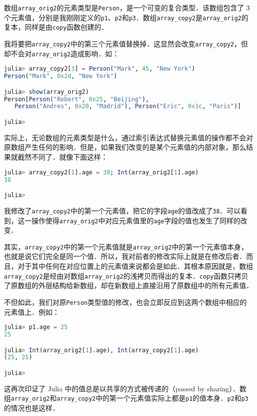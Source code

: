 数组\verb|array_orig2|的元素类型是\verb|Person|，是一个可变的复合类型．该数组包含了 3 个元素值，分别是我刚刚定义的\verb|p1|、\verb|p2|和\verb|p3|．数组\verb|array_copy2|是\verb|array_orig2|的复本，同样是由\verb|copy|函数创建的．

我将要把\verb|array_copy2|中的第三个元素值替换掉．这显然会改变\verb|array_copy2|，但却不会对\verb|array_orig2|造成影响．如：

\begin{lstlisting}[language=julia]
julia> array_copy2[3] = Person("Mark", 45, "New York")
Person("Mark", 0x2d, "New York")

julia> show(array_orig2)
Person[Person("Robert", 0x25, "Beijing"),
   Person("Andres", 0x20, "Madrid"), Person("Eric", 0x1c, "Paris")]

julia> 
\end{lstlisting}

实际上，无论数组的元素类型是什么，通过索引表达式替换元素值的操作都不会对原数组产生任何的影响．但是，如果我们改变的是某个元素值的内部对象，那么结果就截然不同了．就像下面这样：

\begin{lstlisting}[language=julia]
julia> array_copy2[1].age = 38; Int(array_orig2[1].age)
38

julia> 
\end{lstlisting}

我修改了\verb|array_copy2|中的第一个元素值，把它的字段\verb|age|的值改成了\verb|38|．可以看到，这一操作使得\verb|array_orig2|中对应元素值里的\verb|age|字段的值也发生了同样的改变．

其实，\verb|array_copy2|中的第一个元素值就是\verb|array_orig2|中的第一个元素值本身，也就是说它们完全是同一个值．所以，我对前者的修改实际上就是在修改后者．而且，对于其中任何在对应位置上的元素值来说都会是如此．其根本原因就是，数组\verb|array_copy2|是经由对数组\verb|array_orig2|的浅拷贝而得出的复本．\verb|copy|函数只拷贝了原数组的外层结构给新数组，却在新数组上直接沿用了原数组中的所有元素值．

不但如此，我们对原\verb|Person|类型值的修改，也会立即反应到这两个数组中相应的元素值上．例如：

\begin{lstlisting}[language=julia]
julia> p1.age = 25
25

julia> Int(array_orig2[1].age), Int(array_copy2[1].age)
(25, 25)

julia> 
\end{lstlisting}

这再次印证了 Julia 中的值总是以共享的方式被传递的（passed by sharing）．数组\verb|array_orig2|和\verb|array_copy2|中的第一个元素值实际上都是\verb|p1|的值本身．\verb|p2|和\verb|p3|的情况也是这样．

